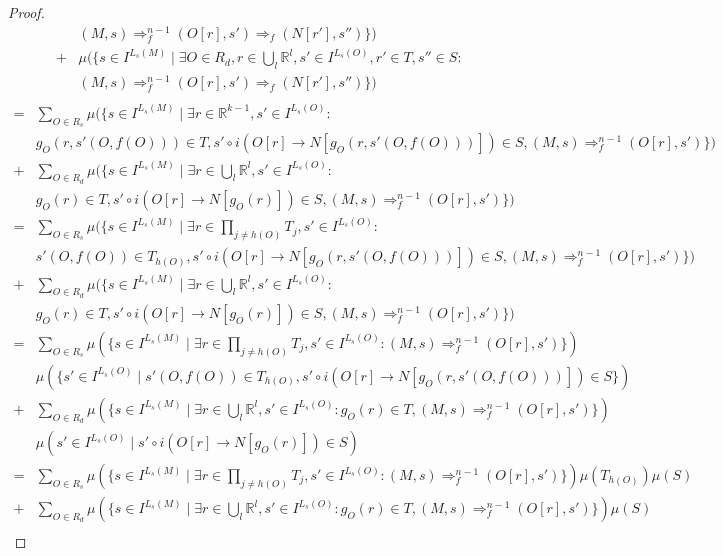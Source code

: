 \documentclass{article}
\theoremstyle{definition}
\theoremstyle{lemma}
\theoremstyle{remark}
\begin{document}
\begin{proof}
\begin{align*}
    & (M,s) \Rightarrow_f^{n-1} (O[r], s') \Rightarrow_f (N[r'], s'')\})\\
    + & \mu(\{s \in I^{L_s(M)} \mid \exists O \in R_d, r \in \bigcup_l \mathbb R^l, s' \in I^{L_s(O)}, r' \in T, s'' \in S :\\
    & (M,s) \Rightarrow_f^{n-1} (O[r], s') \Rightarrow_f (N[r'], s'')\}) \\
\end{align*}
\begin{align*}
= & \sum_{O \in R_s} \mu(\{s \in I^{L_s(M)} \mid \exists r \in \mathbb R^{k-1}, s' \in I^{L_s(O)}:\\
    & g_O(r,s'(O,f(O))) \in T, s' \circ i(O[r] \to N[g_O(r,s'(O,f(O)))]) \in S, (M,s) \Rightarrow_f^{n-1} (O[r], s')\})\\
     + & \sum_{O \in R_d} \mu(\{s \in I^{L_s(M)} \mid \exists r \in \bigcup_l \mathbb R^l, s' \in I^{L_s(O)}:\\
     & g_O(r) \in T, s' \circ i(O[r] \to N[g_O(r)]) \in S, (M,s) \Rightarrow_f^{n-1} (O[r], s')\}) \\
= & \sum_{O \in R_s} \mu(\{s \in I^{L_s(M)} \mid \exists r \in \prod_{j \neq h(O)} T_j, s' \in I^{L_s(O)}:\\
    & s'(O,f(O)) \in T_{h(O)}, s' \circ i(O[r] \to N[g_O(r,s'(O,f(O)))]) \in S, (M,s) \Rightarrow_f^{n-1} (O[r], s')\})\\
    + & \sum_{O \in R_d} \mu(\{s \in I^{L_s(M)} \mid \exists r \in \bigcup_l \mathbb R^l, s' \in I^{L_s(O)}:\\
    & g_O(r) \in T, s' \circ i(O[r] \to N[g_O(r)]) \in S, (M,s) \Rightarrow_f^{n-1} (O[r], s')\}) \\
= & \sum_{O \in R_s} \mu(\{s \in I^{L_s(M)} \mid \exists r \in \prod_{j \neq h(O)} T_j, s' \in I^{L_s(O)} : (M,s) \Rightarrow_f^{n-1} (O[r], s')\})\\
    & \mu(\{s' \in I^{L_s(O)} \mid s'(O,f(O)) \in T_{h(O)}, s' \circ i(O[r] \to N[g_O(r,s'(O,f(O)))]) \in S\})\\
    + & \sum_{O \in R_d} \mu(\{s \in I^{L_s(M)} \mid \exists r \in \bigcup_l \mathbb R^l, s' \in I^{L_s(O)}: g_O(r) \in T, (M,s) \Rightarrow_f^{n-1} (O[r], s')\})\\
    & \mu({s' \in I^{L_s(O)} \mid s' \circ i(O[r] \to N[g_O(r)]) \in S}) \\
= & \sum_{O \in R_s} \mu(\{s \in I^{L_s(M)} \mid \exists r \in \prod_{j \neq h(O)} T_j, s' \in I^{L_s(O)} : (M,s) \Rightarrow_f^{n-1} (O[r], s')\}) \mu(T_{h(O)}) \mu(S)\\
    + & \sum_{O \in R_d} \mu(\{s \in I^{L_s(M)} \mid \exists r \in \bigcup_l \mathbb R^l, s' \in I^{L_s(O)}: g_O(r) \in T, (M,s) \Rightarrow_f^{n-1} (O[r], s')\}) \mu(S) \\

\end{align*}
\end{proof}
\end{document}
